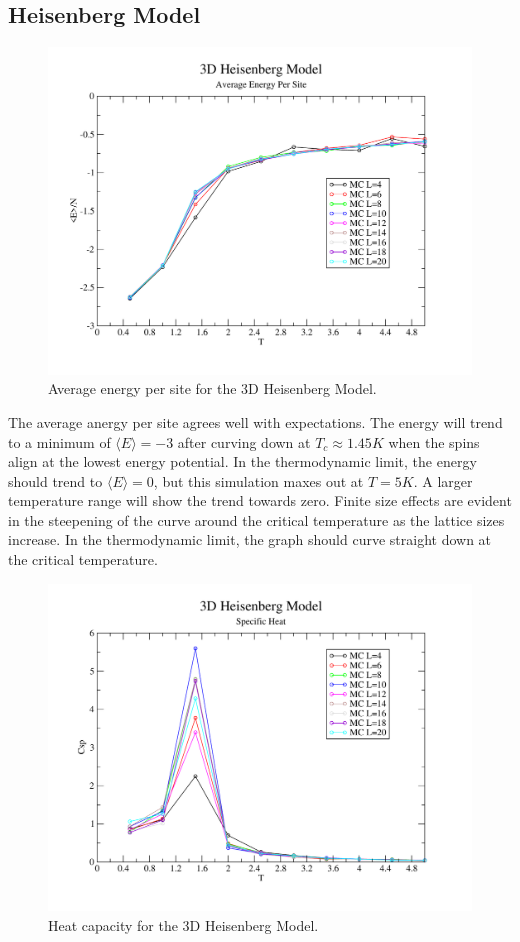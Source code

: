 \documentclass[a4paper,12pt]{article}
\begin{document}
\subsection{Heisenberg Model}
	\begin{figure}[H]
			\centering
			\includegraphics[scale=0.65]{e_avg.pdf}
			\caption{Average energy per site for the 3D Heisenberg Model.}
			\label{fig:heisenberg_e_avg}
		\end{figure}
		
		The average anergy per site agrees well with expectations. The energy will trend to a minimum of $\langle E \rangle = -3$ after curving down at $T_c \approx 1.45 K$ when the spins align at the lowest energy potential. In the thermodynamic limit, the energy should trend to $\langle E \rangle = 0$, but this simulation maxes out at $T = 5 K$. A larger temperature range will show the trend towards zero. Finite size effects are evident in the steepening of the curve around the critical temperature as the lattice sizes increase. In the thermodynamic limit, the graph should curve straight down at the critical temperature.

		\begin{figure}[H]
			\centering
			\includegraphics[scale=0.65]{cplot}
			\caption{Heat capacity for the 3D Heisenberg Model.}
			\label{fig:heisenberg_heat_capacity}
		\end{figure}
		
\end{document}

